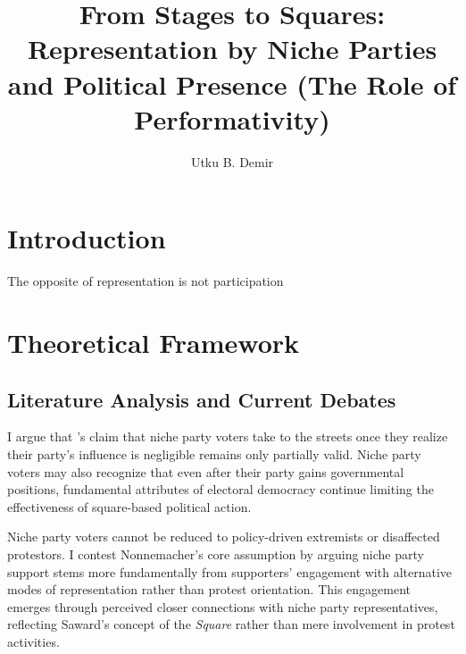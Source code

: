 

\usepackage{tcolorbox}


\title{From Stages to Squares: Representation by Niche Parties and Political Presence (The Role of Performativity)}

\author{Utku B. Demir}




\maketitle

\chapter{Introduction}\label{chap:Introduction}

\epigraph{The opposite of representation is not participation}{\cite{plotke1997}}

\chapter{Theoretical Framework}\label{chap:Theoretical-Framework}

\section{Literature Analysis and Current Debates}\label{sec:Literature-Analysis}

\textcite{blumenau2024}

I argue that \textcite{nonnemacher2023}'s claim that niche party voters take to the streets once they realize their party's influence is negligible remains only partially valid. Niche party voters may also recognize that even after their party gains governmental positions, fundamental attributes of electoral democracy continue limiting the effectiveness of square-based political action.

Niche party voters cannot be reduced to policy-driven extremists or disaffected protestors.  I contest Nonnemacher's core assumption by arguing niche party support stems more fundamentally from supporters' engagement with alternative modes of representation rather than protest orientation. This engagement emerges through perceived closer connections with niche party representatives, reflecting Saward's concept of the \textit{Square} rather than mere involvement in protest activities.


